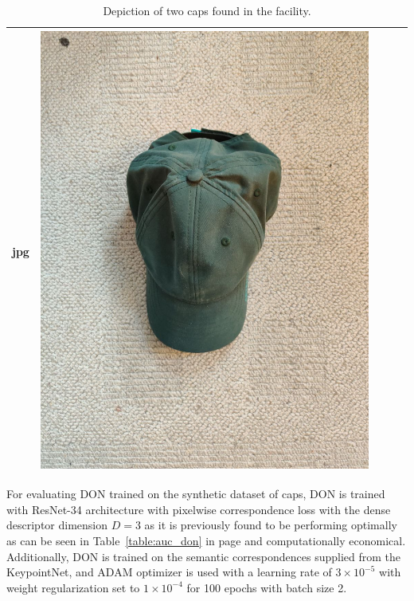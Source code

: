 \begin{table}[htb]
\begin{tabular}{lcccc}
jpg}} & \multicolumn{1}{c}{\includegraphics[scale=0.1]{images/cap/wild_b.jpg}} \\ \hline
    \end{tabular}
    \caption{Depiction of two caps found in the facility.}
    \label{table:cap_wild}
\end{table}

For evaluating \ac{DON} trained on the synthetic dataset of caps, \ac{DON} is trained with \ac{ResNet}-34 architecture with pixelwise correspondence loss with the dense
descriptor dimension $D=3$ as it is previously found to be performing optimally as can be seen in Table~\ref{table:auc_don} in page \pageref{table:auc_don} and computationally economical.
Additionally, \ac{DON} is trained on the semantic correspondences supplied from the KeypointNet, and ADAM optimizer is used with a learning rate of $3 \times 10^{-5}$
with weight regularization set to $1 \times 10^{-4}$ for 100 epochs with batch size 2.\\

